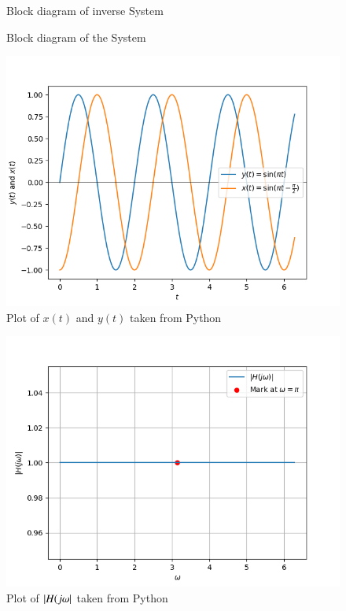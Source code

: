 \documentclass[journal,12pt,twocolumn]{IEEEtran}
\theoremstyle{remark}
\begin{document}
\begin{figure}[htb]
  \centering
  
  \captionsetup{justification=centering, singlelinecheck=off}
  \caption{Block diagram of inverse System}
  \label{fig:tikz_circuit}
\end{figure}

\begin{figure}[htb]
  \centering
  
  \captionsetup{justification=centering, singlelinecheck=off}
  \caption{Block diagram of the System}
  \label{fig:tikz_circuit}
\end{figure}

\begin{figure}[h]
  \centering
  \includegraphics[width=\columnwidth]{./figs/fig1.png} 
  \captionsetup{justification=centering}
  \caption{Plot of $x(t)$ and $y(t)$ taken from Python}
  \label{fig:your_label}
\end{figure}

\begin{figure}[h]
  \centering
  \includegraphics[width=\columnwidth]{./figs/fig2.png} 
  \captionsetup{justification=centering}
  \caption{Plot of $\left\vert H(j\omega\right\vert$  taken from Python}
  \label{fig:your_label}
\end{figure}


 
\end{document}
